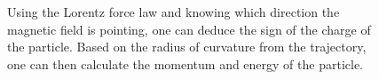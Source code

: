\begin{figure}[pbth]
{    %
    Using the Lorentz force law and knowing which direction the magnetic field is pointing, one can deduce the sign of the charge of the particle. 
    Based on the radius of curvature from the trajectory, one can then calculate the momentum and energy of the particle.
    } 
    \label{fig:cms_particle_trajectories}
\end{figure}
